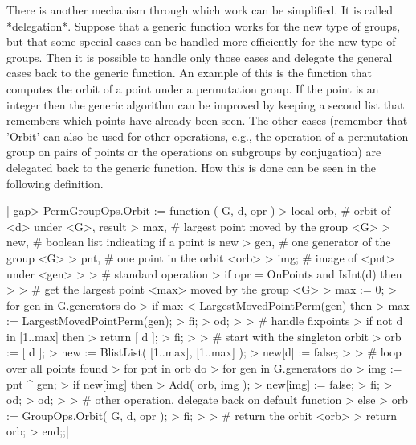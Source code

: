There is another mechanism  through which work can be  simplified.  It is
called *delegation*.  Suppose that  a  generic function works for the new
type of  groups,  but  that  some  special  cases  can  be  handled  more
efficiently for  the new type of  groups.  Then it is possible  to handle
only  those cases  and delegate  the  general  cases back  to the generic
function.  An example  of this is the function that computes the orbit of
a point under a permutation  group.  If the point is an integer  then the
generic algorithm can be improved by keeping a second list that remembers
which  points have  already  been seen.   The other cases (remember  that
'Orbit' can also be used for  other operations, e.g., the operation of  a
permutation group on  pairs  of points or the operations on  subgroups by
conjugation)  are delegated back  to the generic  function.  How  this is
done can be seen in the following definition.

|    gap> PermGroupOps.Orbit := function ( G, d, opr )
    >     local   orb,        # orbit of <d> under <G>, result
    >             max,        # largest point moved by the group <G>
    >             new,        # boolean list indicating if a point is new
    >             gen,        # one generator of the group <G>
    >             pnt,        # one point in the orbit <orb>
    >             img;        # image of <pnt> under <gen>
    >
    >     # standard operation
    >     if   opr = OnPoints  and IsInt(d)  then
    >
    >         # get the largest point <max> moved by the group <G>
    >         max := 0;
    >         for gen  in G.generators  do
    >             if max < LargestMovedPointPerm(gen)  then
    >                 max := LargestMovedPointPerm(gen);
    >             fi;
    >         od;
    >
    >         # handle fixpoints
    >         if not d in [1..max]  then
    >             return [ d ];
    >         fi;
    >
    >         # start with the singleton orbit
    >         orb := [ d ];
    >         new := BlistList( [1..max], [1..max] );
    >         new[d] := false;
    >
    >         # loop over all points found
    >         for pnt  in orb  do
    >             for gen  in G.generators  do
    >                 img := pnt ^ gen;
    >                 if new[img]  then
    >                     Add( orb, img );
    >                     new[img] := false;
    >                 fi;
    >             od;
    >         od;
    >
    >     # other operation, delegate back on default function
    >     else
    >         orb := GroupOps.Orbit( G, d, opr );
    >     fi;
    >
    >     # return the orbit <orb>
    >     return orb;
    > end;;|

